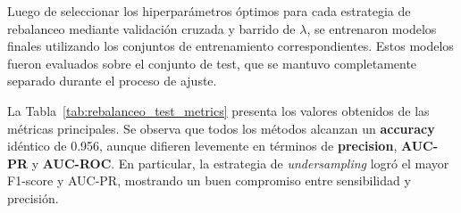 \documentclass[11pt]{article}
\begin{document}
Luego de seleccionar los hiperparámetros óptimos para cada estrategia de rebalanceo mediante validación cruzada y barrido de $\lambda$, se entrenaron modelos finales utilizando los conjuntos de entrenamiento correspondientes. Estos modelos fueron evaluados sobre el conjunto de test, que se mantuvo completamente separado durante el proceso de ajuste.

La Tabla~\ref{tab:rebalanceo_test_metrics} presenta los valores obtenidos de las métricas principales. Se observa que todos los métodos alcanzan un \textbf{accuracy} idéntico de 0.956, aunque difieren levemente en términos de \textbf{precision}, \textbf{AUC-PR} y \textbf{AUC-ROC}. En particular, la estrategia de \textit{undersampling} logró el mayor F1-score y AUC-PR, mostrando un buen compromiso entre sensibilidad y precisión.

\begin{table}[H]
    \centering
    \caption{Métricas de desempeño final sobre el conjunto de test para distintos métodos de rebalanceo, utilizando los hiperparámetros previamente seleccionados.}
    \label{tab:rebalanceo_test_metrics}
\end{table}
\end{document}
